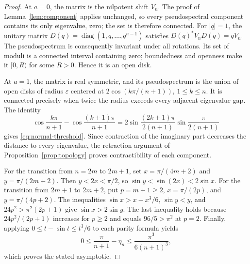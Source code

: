 \documentclass[preprints,article,accept,oneauthor]{Definitions/mdpi}
\numberwithin{equation}{section}
\newcounter{result}[section]
\theoremstyle{mdpi}
\newtheorem{proposition}[result]{Proposition}
\theoremstyle{definition}
\DeclareMathOperator{\diag}{diag}
\begin{document}

\begin{proof}
At \(a=0\), the matrix is the nilpotent shift \(V_n\).
The proof of Lemma~\ref{lem:component} applies unchanged, so every
pseudospectral component contains its only eigenvalue, zero; the set is
therefore connected.  For \(|q|=1\), the unitary matrix
\(D(q)=\diag(1,q,\ldots,q^{n-1})\) satisfies \(D(q)^*V_nD(q)=qV_n\).
The pseudospectrum is consequently invariant under all rotations.  Its
set of moduli is a connected interval containing zero; boundedness and
openness make it \([0,R)\) for some \(R>0\).  Hence it is an open disk.

At \(a=1\), the matrix is real symmetric, and its pseudospectrum is the
union of open disks of radius \(\varepsilon\) centered at
\(2\cos(k\pi/(n+1))\), \(1\leq k\leq n\).  It is connected precisely
when twice the radius exceeds every adjacent eigenvalue gap.  The identity
\[
 \cos\frac{k\pi}{n+1}-\cos\frac{(k+1)\pi}{n+1}
 =2\sin\frac{(2k+1)\pi}{2(n+1)}\sin\frac{\pi}{2(n+1)}
\]
gives \eqref{eq:normal-threshold}.  Since contraction of the imaginary
part decreases the distance to every eigenvalue, the retraction argument
of Proposition~\ref{prop:topology} proves contractibility of each component.

For the transition from \(n=2m\) to \(2m+1\), set
\(x=\pi/(4m+2)\) and \(y=\pi/(2m+2)\).  Then
\(y<2x<\pi/2\), so \(\sin y<\sin(2x)<2\sin x\).
For the transition from \(2m+1\) to \(2m+2\), put
\(p=m+1\geq2\), \(x=\pi/(2p)\), and \(y=\pi/(4p+2)\).
The inequalities \(\sin x>x-x^3/6\), \(\sin y<y\), and
\(24p^2>\pi^2(2p+1)\) give \(\sin x>2\sin y\).
The last inequality holds because \(24p^2/(2p+1)\) increases for
\(p\geq2\) and equals \(96/5>\pi^2\) at \(p=2\).
Finally, applying \(0\leq t-\sin t\leq t^3/6\) to each parity formula yields
\[
 0\leq\frac{\pi}{n+1}-\eta_n\leq\frac{\pi^3}{6(n+1)^3},
\]
which proves the stated asymptotic.
\end{proof}
\end{document}

